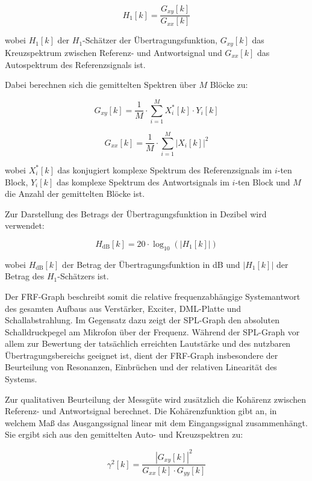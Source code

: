 \begin{equation}
H_1[k] = \frac{G_{xy}[k]}{G_{xx}[k]}
\end{equation}

wobei $H_1[k]$ der $H_1$-Schätzer der Übertragungsfunktion, $G_{xy}[k]$ das Kreuzspektrum zwischen Referenz- und Antwortsignal und $G_{xx}[k]$ das Autospektrum des Referenzsignals ist.

Dabei berechnen sich die gemittelten Spektren über $M$ Blöcke zu:

\begin{equation}
G_{xy}[k] = \frac{1}{M} \cdot \sum_{i=1}^{M} X_i^*[k] \cdot Y_i[k]
\end{equation}

\begin{equation}
G_{xx}[k] = \frac{1}{M} \cdot \sum_{i=1}^{M} |X_i[k]|^2
\end{equation}

wobei $X_i^*[k]$ das konjugiert komplexe Spektrum des Referenzsignals im $i$-ten Block, $Y_i[k]$ das komplexe Spektrum des Antwortsignals im $i$-ten Block und $M$ die Anzahl der gemittelten Blöcke ist.

Zur Darstellung des Betrags der Übertragungsfunktion in Dezibel wird verwendet:

\begin{equation}
H_{\mathrm{dB}}[k] = 20 \cdot \log_{10}\left(|H_1[k]|\right)
\end{equation}

wobei $H_{\mathrm{dB}}[k]$ der Betrag der Übertragungsfunktion in dB und $|H_1[k]|$ der Betrag des $H_1$-Schätzers ist.

Der FRF-Graph beschreibt somit die relative frequenzabhängige Systemantwort des gesamten Aufbaus aus Verstärker, Exciter, DML-Platte und Schallabstrahlung. Im Gegensatz dazu zeigt der SPL-Graph den absoluten Schalldruckpegel am Mikrofon über der Frequenz. Während der SPL-Graph vor allem zur Bewertung der tatsächlich erreichten Lautstärke und des nutzbaren Übertragungsbereichs geeignet ist, dient der FRF-Graph insbesondere der Beurteilung von Resonanzen, Einbrüchen und der relativen Linearität des Systems.

Zur qualitativen Beurteilung der Messgüte wird zusätzlich die Kohärenz zwischen Referenz- und Antwortsignal berechnet. Die Kohärenzfunktion gibt an, in welchem Maß das Ausgangssignal linear mit dem Eingangssignal zusammenhängt. Sie ergibt sich aus den gemittelten Auto- und Kreuzspektren zu:

\begin{equation}
\gamma^2[k] = \frac{|G_{xy}[k]|^2}{G_{xx}[k] \cdot G_{yy}[k]}
\end{equation}

